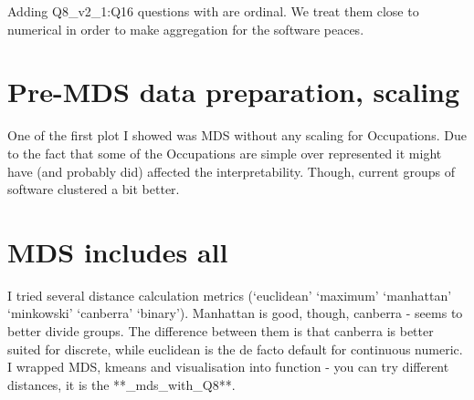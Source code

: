 \documentclass[]{article}
\newenvironment{Shaded}{\begin{snugshade}}{\end{snugshade}}
\newcommand{\KeywordTok}[1]{\textcolor[rgb]{0.13,0.29,0.53}{\textbf{{#1}}}}
\newcommand{\DecValTok}[1]{\textcolor[rgb]{0.00,0.00,0.81}{{#1}}}
\newcommand{\StringTok}[1]{\textcolor[rgb]{0.31,0.60,0.02}{{#1}}}
\newcommand{\CommentTok}[1]{\textcolor[rgb]{0.56,0.35,0.01}{\textit{{#1}}}}
\newcommand{\NormalTok}[1]{{#1}}
\begin{document}
Adding Q8\_v2\_1:Q16 questions with are ordinal. We treat them close to
numerical in order to make aggregation for the software peaces.

\section{Pre-MDS data preparation,
scaling}\label{pre-mds-data-preparation-scaling}

One of the first plot I showed was MDS without any scaling for
Occupations. Due to the fact that some of the Occupations are simple
over represented it might have (and probably did) affected the
interpretability. Though, current groups of software clustered a bit
better.

\begin{Shaded}
\end{Shaded}

\section{MDS includes all}\label{mds-includes-all}

I tried several distance calculation metrics (`euclidean' `maximum'
`manhattan' `minkowski' `canberra' `binary'). Manhattan is good, though,
canberra - seems to better divide groups. The difference between them is
that canberra is better suited for discrete, while euclidean is the de
facto default for continuous numeric. I wrapped MDS, kmeans and
visualisation into function - you can try different distances, it is the
**\_mds\_with\_Q8**.
\end{document}
